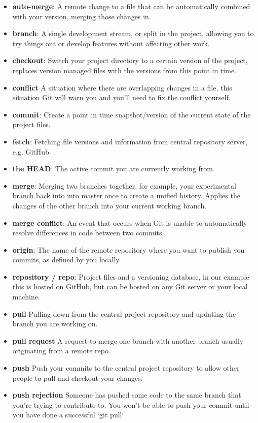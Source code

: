 \begin{itemize}[leftmargin=*]
	\item
	\textbf{auto-merge}:
		A remote change to a file that can be automatically combined with your version, merging those changes in.
	\item
		\textbf{branch}:
		A single development stream, or split in the project, allowing you to try things out or develop features without affecting other work.
	\item
		\textbf{checkout}:
		Switch your project directory to a certain version of the project, replaces version managed files with the versions from this point in time.
	\item
		\textbf{conflict}
		A situation where there are overlapping changes in a file, this situation Git will warn you and you’ll need to fix the conflict yourself.
	\item
		\textbf{commit}:
		Create a point in time snapshot/version of the current state of the project files.
	\item
        \textbf{fetch}:
		Fetching file versions and information from central repository server, e.g. GitHub
	\item
        \textbf{the HEAD}:
		The active commit you are currently working from.
	\item
		\textbf{merge}:
		Merging two branches together, for example, your experimental branch back into into master once to create a unified history. Applies the changes of the other branch into your current working branch.
    \item
		\textbf{merge conflict}:
		An event that occurs when Git is unable to automatically resolve differences in code between two commits.
	\item
		\textbf{origin}:
		The name of the remote repository where you want to publish you commits, as defined by you locally.
	\item
        \textbf{repository / repo}:
        Project files and a versioning database, in our example this is hosted on GitHub, but can be hosted on any Git server or your local machine.
    \item
    	\textbf{pull}
    	Pulling down from the central project repository and updating the branch you are working on.
   \item
    	\textbf{pull request}
    	A request to merge one branch with another branch usually originating from a remote repo.
    \item
    	\textbf{push}
    	Push your commits to the central project repository to allow other people to pull and checkout your changes.
    \item
    	\textbf{push rejection}
    	Someone has pushed some code to the same branch that you’re trying to contribute to. You won't be able to push your commit until you have done a successful `git pull`
\end{itemize}